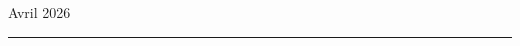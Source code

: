 \begin{titlepage}
\begin{center}
        \vspace*{15mm}
        
        {\large Avril 2026}
        
    \end{center}
    \rule{\textwidth}{0.3pt}
\end{titlepage}